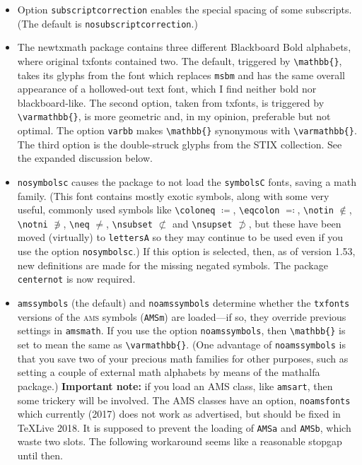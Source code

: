 \documentclass[11pt]{article}
\theoremstyle{oldplain}
\theoremstyle{plain}
\begin{document}
\begin{itemize}
\item Option {\tt subscriptcorrection} enables the special spacing of some subscripts. (The default is {\tt nosubscriptcorrection}.)
\item The \textsf{newtxmath} package contains three different Blackboard Bold alphabets, where original \textsf{txfonts} contained two. The default, triggered by \verb|\mathbb{}|, takes its glyphs from the font which replaces {\tt msbm} and has the same overall appearance of a hollowed-out text font, which I find neither bold nor blackboard-like. The second option, taken from \textsf{txfonts}, is triggered by \verb|\varmathbb{}|, is more geometric and, in my opinion, preferable but not optimal. The option {\tt varbb} makes \verb|\mathbb{}| synonymous with \verb|\varmathbb{}|. The third option is the double-struck glyphs from the STIX collection. See the expanded discussion below.
\item {\tt nosymbolsc} causes the package to not load the {\tt symbolsC} fonts, saving  a math family. (This font contains mostly exotic symbols, along with some very useful, commonly used symbols like \verb|\coloneq| $\coloneq$, \verb|\eqcolon| $\eqcolon$, \verb|\notin| $\notin$, \verb|\notni| $\notni$, \verb|\neq| $\neq$, \verb|\nsubset| $\nsubset$ and \verb|\nsupset| $\nsupset$, but these have been moved (virtually) to {\tt lettersA} so they may continue to be used even if you use the option {\tt nosymbolsc}.) If this option is selected, then, as of version 1.53, new definitions are made for the missing negated symbols. The package {\tt centernot} is now required.
\item {\tt amssymbols} (the default) and {\tt noamssymbols} determine whether the {\tt txfonts} versions of the \textsc{ams} symbols ({\tt AMSm}) are loaded---if so, they override previous settings in {\tt amsmath}. If you use the option {\tt noamssymbols}, then \verb|\mathbb{}| is set to mean the same as \verb|\varmathbb{}|. (One advantage of {\tt noamssymbols} is that you save two of your precious math families for other purposes, such as setting a couple of external math alphabets by means of the \textsf{mathalfa} package.) \textbf{Important note:} if you load an AMS class, like {\tt amsart}, then some trickery will be involved. The AMS classes have an option, {\tt noamsfonts} which currently (2017) does not work as advertised, but should be fixed in \TeX Live 2018. It is supposed to prevent the loading of {\tt AMSa} and {\tt AMSb}, which waste two slots. The following workaround seems like a reasonable stopgap until then.
\begin{verbatim}

\end{verbatim}
\end{itemize}
\end{document}
